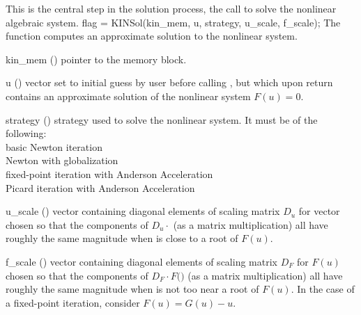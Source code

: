 This is the central step in the solution process, the call to solve
the nonlinear algebraic system.
%
{
  flag = KINSol(kin\_mem, u, strategy, u\_scale, f\_scale);
}
{
  The function  computes an approximate solution to the nonlinear
  system.
}
{
  \begin{args}[strategy]
  \item[kin\_mem] ()
    pointer to the {\kinsol} memory block.
  \item[u] ()
    vector set to initial guess by user before calling ,
    but which upon return contains an approximate solution of
    the nonlinear system $F(u) = 0$.
  \item[strategy] ()
    strategy used to solve the nonlinear system. It must be of the following: \\
      basic Newton iteration \\
     Newton with globalization \\
     fixed-point iteration with Anderson Acceleration \\
     Picard iteration with Anderson Acceleration \\
  \item[u\_scale] ()
    vector containing diagonal elements of scaling matrix $D_u$ for vector 
    chosen so that the components of $D_u \cdot$
    (as a matrix multiplication) all have roughly the same magnitude when 
     is close to a root of $F(u)$.
  \item[f\_scale] ()
    vector containing diagonal elements of scaling matrix $D_F$ for $F(u)$ chosen 
    so that the components of $D_F \cdot F($$)$ 
    (as a matrix multiplication) all have roughly the same magnitude when 
     is not too near a root of $F(u)$. In the case of a fixed-point
    iteration, consider $F(u) = G(u) - u$.
  \end{args}
}
